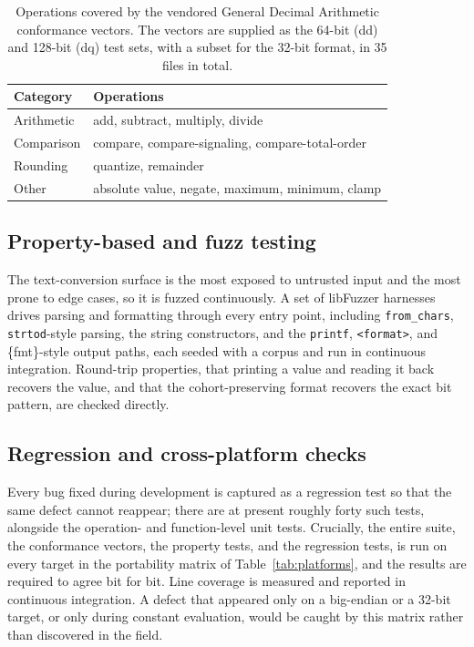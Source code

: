 \documentclass[acmsmall]{acmart}
\begin{document}
\begin{table}
  \caption{Operations covered by the vendored General Decimal Arithmetic conformance
    vectors. The vectors are supplied as the 64-bit (dd) and 128-bit (dq) test sets, with a
    subset for the 32-bit format, in 35 files in total.}
  \label{tab:dectest}
  \footnotesize
  \begin{tabular}{ll}
    \toprule
    Category & Operations \\
    \midrule
    Arithmetic & add, subtract, multiply, divide \\
    Comparison & compare, compare-signaling, compare-total-order \\
    Rounding   & quantize, remainder \\
    Other      & absolute value, negate, maximum, minimum, clamp \\
    \bottomrule
  \end{tabular}
\end{table}

\subsection{Property-based and fuzz testing}
The text-conversion surface is the most exposed to untrusted input and the most prone to
edge cases, so it is fuzzed continuously. A set of libFuzzer harnesses drives parsing and
formatting through every entry point, including \texttt{from\_chars},
\texttt{strtod}-style parsing, the string constructors, and the \texttt{printf},
\texttt{<format>}, and \{fmt\}-style output paths, each seeded with a corpus and run in
continuous integration. Round-trip properties, that printing a value and reading it back
recovers the value, and that the cohort-preserving format recovers the exact bit pattern,
are checked directly.

\subsection{Regression and cross-platform checks}
Every bug fixed during development is captured as a regression test so that the same
defect cannot reappear; there are at present roughly forty such tests, alongside the
operation- and function-level unit tests. Crucially, the entire suite, the conformance
vectors, the property tests, and the regression tests, is run on every target in the
portability matrix of Table~\ref{tab:platforms}, and the results are required to agree bit
for bit. Line coverage is measured and reported in continuous integration. A defect that
appeared only on a big-endian or a 32-bit target, or only during constant evaluation,
would be caught by this matrix rather than discovered in the field.
\end{document}
